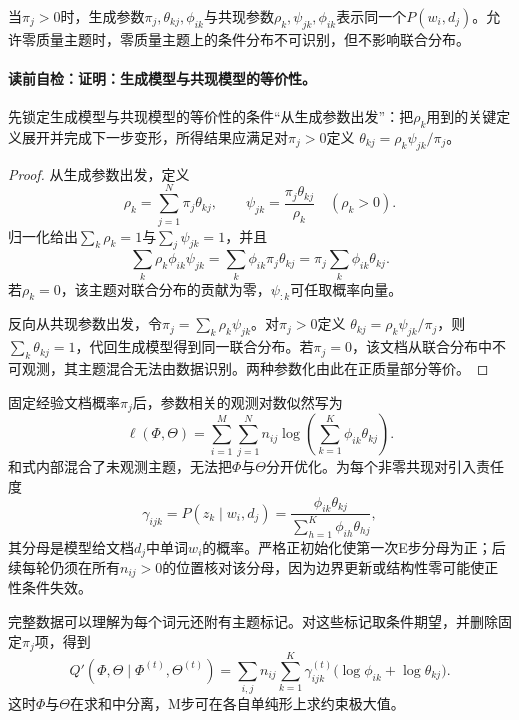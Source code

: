 \begin{theorem}[生成模型与共现模型的等价性]\label{thm:V4-C06-equivalence}
当$\pi_j>0$时，生成参数$\pi_j,\theta_{kj},\phi_{ik}$与共现参数$\rho_k,\psi_{jk},\phi_{ik}$表示同一个$P(w_i,d_j)$。允许零质量主题时，零质量主题上的条件分布不可识别，但不影响联合分布。
\end{theorem}

\paragraph{读前自检：证明：生成模型与共现模型的等价性。}先锁定生成模型与共现模型的等价性的条件“从生成参数出发”：把$\rho_k$用到的关键定义展开并完成下一步变形，所得结果应满足对$\pi_j>0$定义 $\theta_{kj}=\rho_k\psi_{jk}/\pi_j$。\par

\begin{proof}
从生成参数出发，定义
\[
\rho_k=\sum_{j=1}^N\pi_j\theta_{kj},\qquad
\psi_{jk}=\frac{\pi_j\theta_{kj}}{\rho_k}\quad(\rho_k>0).
\]
归一化给出$\sum_k\rho_k=1$与$\sum_j\psi_{jk}=1$，并且
\[
\sum_k\rho_k\phi_{ik}\psi_{jk}
=\sum_k\phi_{ik}\pi_j\theta_{kj}
=\pi_j\sum_k\phi_{ik}\theta_{kj}.
\]
若$\rho_k=0$，该主题对联合分布的贡献为零，$\psi_{:k}$可任取概率向量。

反向从共现参数出发，令$\pi_j=\sum_k\rho_k\psi_{jk}$。对$\pi_j>0$定义
$\theta_{kj}=\rho_k\psi_{jk}/\pi_j$，则$\sum_k\theta_{kj}=1$，代回生成模型得到同一联合分布。若$\pi_j=0$，该文档从联合分布中不可观测，其主题混合无法由数据识别。两种参数化由此在正质量部分等价。
\end{proof}

固定经验文档概率$\pi_j$后，参数相关的观测对数似然写为
\[
\ell(\Phi,\Theta)
=\sum_{i=1}^M\sum_{j=1}^N n_{ij}
\log\!\left(\sum_{k=1}^K\phi_{ik}\theta_{kj}\right).
\]
和式内部混合了未观测主题，无法把$\Phi$与$\Theta$分开优化。为每个非零共现对引入责任度
\[
\gamma_{ijk}=P(z_k\mid w_i,d_j)
=\frac{\phi_{ik}\theta_{kj}}
{\sum_{h=1}^K\phi_{ih}\theta_{hj}},
\]
其分母是模型给文档$d_j$中单词$w_i$的概率。严格正初始化使第一次E步分母为正；后续每轮仍须在所有$n_{ij}>0$的位置核对该分母，因为边界更新或结构性零可能使正性条件失效。

完整数据可以理解为每个词元还附有主题标记。对这些标记取条件期望，并删除固定$\pi_j$项，得到
\[
Q'(\Phi,\Theta\mid\Phi^{(t)},\Theta^{(t)})
=\sum_{i,j}n_{ij}\sum_{k=1}^K\gamma_{ijk}^{(t)}
\bigl(\log\phi_{ik}+\log\theta_{kj}\bigr).
\]
这时$\Phi$与$\Theta$在求和中分离，M步可在各自单纯形上求约束极大值。

